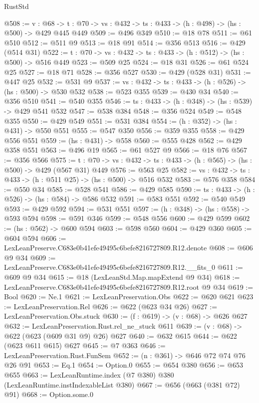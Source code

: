 \begin{lexlean}{RustStd}
\begin{coremodule}
@508 := {v : @68} ->
  {t : @70} -> {vs : @432} -> {ts : @433} -> (h : @498) -> (hs : @500) -> @429 @445 @449
@509 := @496 @349
@510 := @18 @78
@511 := @61 @510
@512 := @511 @9
@513 := @18 @91
@514 := @356 @513
@516 := @429 (@514 @31)
@522 := {t : @70} -> {vs : @432} -> {ts : @433} -> (h : @512) -> (hs : @500) -> @516 @449
@523 := @509 @25
@524 := @18 @31
@526 := @61 @524 @25
@527 := @18 @71
@528 := @356 @527
@530 := @429 (@528 @31)
@531 := @447 @25
@532 := @531 @9
@537 := {vs : @432} -> {ts : @433} -> (h : @526) -> (hs : @500) -> @530 @532
@538 := @523 @355
@539 := @430 @34
@540 := @356 @510
@541 := @540 @355
@546 := {ts : @433} -> (h : @348) -> (hs : @539) -> @429 @541 @532
@547 := @538 @384
@548 := @356 @524
@549 := @548 @355
@550 := @429 @549
@551 := @531 @384
@554 := (h : @352) -> (hs : @431) -> @550 @551
@555 := @547 @350
@556 := @359 @355
@558 := @429 @556 @551
@559 := (hs : @431) -> @558
@560 := @555 @428
@562 := @429 @358 @551
@563 := @496 @19
@565 := @61 @527 @9
@566 := @18 @76
@567 := @356 @566
@575 := {t : @70} -> {vs : @432} -> {ts : @433} -> (h : @565) -> (hs : @500) -> @429 (@567 @31) @449
@576 := @563 @25
@582 := {vs : @432} -> {ts : @433} -> (h : @511 @25) -> (hs : @500) -> @516 @532
@583 := @576 @358
@584 := @550 @34
@585 := @528 @541
@586 := @429 @585
@590 := {ts : @433} -> (h : @526) -> (hs : @584) -> @586 @532
@591 := @583 @551
@592 := @540 @549
@593 := @429 @592
@594 := @531 @551
@597 := (h : @348) -> (hs : @558) -> @593 @594
@598 := @591 @346
@599 := @548 @556
@600 := @429 @599
@602 := (hs : @562) -> @600 @594
@603 := @598 @560
@604 := @429 @360
@605 := @604 @594
@606 := LexLeanPreserve.C683e0b41efe49495c6befe8216727809.R12.denote
@608 := @606 @9 @34
@609 := LexLeanPreserve.C683e0b41efe49495c6befe8216727809.R12.__fits_0
@611 := @609 @9 @34
@615 := @18 (LexLeanStd.Map.mapExtend @9 @34)
@618 := LexLeanPreserve.C683e0b41efe49495c6befe8216727809.R12.root @9 @34
@619 := Bool
@620 := Ne.{1}
@621 := LexLeanPreservation.Obs
@622 := @620 @621
@623 := LexLeanPreservation.Rel
@626 := @622 (@623 @34 @26)
@627 := LexLeanPreservation.Obs.stuck
@630 := (f : @619) -> (v : @68) -> @626 @627
@632 := LexLeanPreservation.Rust.rel_ne_stuck @611
@639 := (v : @68) -> @622 (@623 (@609 @31 @9) @26) @627
@640 := @632 @615
@644 := @622 (@623 @611 @615) @627
@645 := @7 @363
@646 := LexLeanPreservation.Rust.FunSem
@652 := (n : @361) -> @646 @72 @74 @76 @26 @91
@653 := Eq.{1}
@654 := Option.{0}
@655 := @654 @380
@656 := @653 @655
@663 := LexLeanRuntime.index (@7 @380) @380 (LexLeanRuntime.instIndexableList @380)
@667 := @656 (@663 (@381 @72) @91)
@668 := Option.some.{0}

\end{coremodule}
\end{lexlean}
